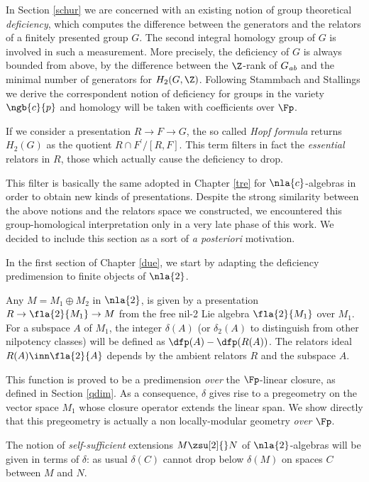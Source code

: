 \smallskip
In Section \ref{schur} we are concerned with an existing notion of group theoretical {\em deficiency}, which computes the difference
between the generators and the relators of a finitely presented group $G$. The second integral homology group of $G$ is involved
in such a measurement.
More precisely, the deficiency of $G$ is always bounded from above, by the difference between the $\Z$-rank of $G_{\it ab}$
and the minimal number of generators for $H_{2}(G,\Z)$.
Following Stammbach and Stallings we derive the correspondent notion of deficiency
for groups in the variety $\ngb{c}{p}$ and homology will be taken with coefficients over $\Fp$.

If we consider a presentation $R\to F\to G$, the so called {\em Hopf formula} returns $H_{2}(G)$ as
the quotient $R\cap F^{\prime}/[R,F]$. This term filters in fact the {\em essential} relators in $R$,
those which actually cause the deficiency to drop.

This filter is basically the same adopted in Chapter \ref{tre} for $\nla{c}$-algebras in order to obtain new kinds of
presentations.
Despite the strong similarity between the above notions and the relators space we constructed,
we encountered this group-homological interpretation only in a very late phase of this work.
We decided to include this section as a sort of {\em a posteriori} motivation.

\bigskip
In the first section of Chapter \ref{due}, we start by adapting the deficiency predimension  to finite objects of $\nla{2}$.

Any $M=M_{1}\oplus M_{2}$ in $\nla{2}$, is given by a presentation $R\to\fla{2}{M_{1}}\to M$ from the free nil-2 Lie algebra
$\fla{2}{M_{1}}$ over $M_{1}$.
For a subspace $A$ of $M_{1}$, the integer $\delta(A)$ (or $\delta_{2}(A)$ to distinguish from other nilpotency classes) will be defined as
$\dfp(A)-\dfp(R(A))$. The
relators ideal $R(A)\inn\fla{2}{A}$ depends by the ambient relators $R$ and the subspace $A$.

This function is proved to be a predimension {\em over} the $\Fp$-linear closure, as defined in Section \ref{qdim}.
As a consequence, $\delta$ gives rise to a pregeometry on the vector space $M_{1}$ whose closure operator extends the
linear span. We show directly that this pregeometry is actually a non locally-modular geometry {\em over} $\Fp$.

The notion of {\em self-sufficient} extensions $M\zsu[2]{}N$ of $\nla{2}$-algebras will be given in terms of $\delta$: as
usual $\delta(C)$ cannot drop below $\delta(M)$ on spaces $C$ between $M$ and $N$.

